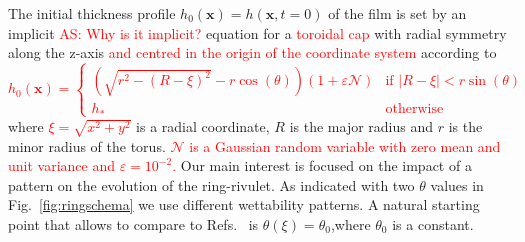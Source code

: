 \documentclass[twoside,twocolumn,9pt]{article}
\begin{document}
The initial thickness profile $h_0(\mathbf{x})=h(\mathbf{x}, t=0)$ of the film is set by an implicit
\textcolor{red}{AS: Why is it implicit?} equation for a \textcolor{red}{toroidal cap} with radial symmetry along the z-axis \textcolor{red}{and centred in the origin of the coordinate system} according to
\textcolor{red}{
\begin{equation}\label{eq:torus}
h_0(\mathbf{x}) = 
\left\{
\begin{array}{ll}
\left(\sqrt{r^2 - \left(R-\xi\right)^2} - r\cos(\theta)\right)(1+\varepsilon\mathcal{N})  & \mbox{if } |R-\xi|<r \sin(\theta)\\
h_{\ast} & \mbox{otherwise}
\end{array}
\right.
\end{equation}
}
where \textcolor{red}{$\xi = \sqrt{x^2+y^2}$} is a radial coordinate, $R$ is the major radius and $r$ is the minor radius of the torus.
\textcolor{red}{$\mathcal{N}$ is a Gaussian random variable with zero mean and 
unit variance and  $\varepsilon = 10^{-2}$.}
Our main interest is focused on the impact of a pattern on the evolution of the ring-rivulet. 
As indicated with two $\theta$ values in Fig.~\ref{fig:ringschema} we use different wettability patterns.
A natural starting point that allows to compare to Refs.~\cite{gonzalezStabilityLiquidRing2013, nguyenCompetitionCollapseBreakup2012, wuBreakupPatternedNanoscale2010} is $\theta(\xi) = \theta_0$,where $\theta_0$ is a constant.
\end{document}
